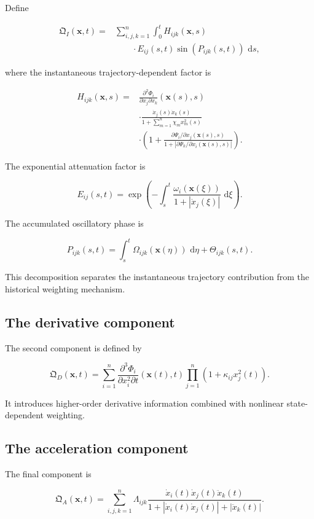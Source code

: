 \documentclass[12pt]{article}
\numberwithin{equation}{section}
\newcommand{\Q}{\mathfrak{Q}}
\newcommand{\dd}{\,\mathrm{d}}
\theoremstyle{definition}
\theoremstyle{remark}
\begin{document}
Define

\[
\begin{aligned}
\Q_I(\mathbf{x},t)
={}&
\sum_{i,j,k=1}^{n}
\int_0^t
H_{ijk}(\mathbf{x},s)
\\
&\qquad\cdot
E_{ij}(s,t)
\sin(P_{ijk}(s,t))
\,\dd s,
\end{aligned}
\]

where the instantaneous trajectory-dependent
factor is

\[
\begin{aligned}
H_{ijk}(\mathbf{x},s)
={}&
\frac{\partial^2\Phi_i}
{\partial x_j\partial x_k}
(\mathbf{x}(s),s)
\\
&\cdot
\frac{\dot{x}_j(s)\dot{x}_k(s)}
{1+\sum_{m=1}^{n}\chi_mx_m^2(s)}
\\
&\cdot
\left(
1+
\frac{
\partial\Psi_i/\partial x_j
(\mathbf{x}(s),s)
}{
1+
\left|
\partial\Psi_k/\partial x_i
(\mathbf{x}(s),s)
\right|
}
\right).
\end{aligned}
\]

The exponential attenuation factor is

\[
E_{ij}(s,t)
=
\exp\left(
-\int_s^t
\frac{\omega_i(\mathbf{x}(\xi))}
{1+|\dot{x}_j(\xi)|}
\,\dd\xi
\right).
\]

The accumulated oscillatory phase is

\[
P_{ijk}(s,t)
=
\int_s^t
\Omega_{ijk}(\mathbf{x}(\eta))
\,\dd\eta
+
\Theta_{ijk}(s,t).
\]

This decomposition separates the
instantaneous trajectory contribution from
the historical weighting mechanism.

\subsection{The derivative component}

The second component is defined by

\[
\Q_D(\mathbf{x},t)
=
\sum_{i=1}^{n}
\frac{\partial^3\Phi_i}
{\partial x_i^2\partial t}
(\mathbf{x}(t),t)
\prod_{j=1}^{n}
(1+\kappa_{ij}x_j^2(t)).
\]

It introduces higher-order derivative
information combined with nonlinear
state-dependent weighting.

\subsection{The acceleration component}

The final component is

\[
\Q_A(\mathbf{x},t)
=
\sum_{i,j,k=1}^{n}
\Lambda_{ijk}
\frac{
\dot{x}_i(t)\dot{x}_j(t)\ddot{x}_k(t)
}{
1+
|\dot{x}_i(t)\dot{x}_j(t)|
+
|\ddot{x}_k(t)|
}.
\]
\end{document}
